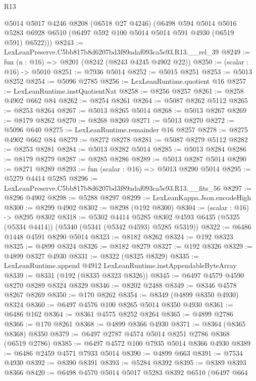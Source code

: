 \begin{lexlean}{R13}
\begin{coremodule}
      @5014
      @5017
      @4246
      @8208
      (@6518 @27 @4246)
      (@6498
        @594
        @5014
        @5016
        @5283
        @6928
        @6510
        (@6497 @592 @100 @5014 @5014 @591 @4930 (@6519 @591) @6522)))
@8243 := LexLeanPreserve.C5bb817b8d6207bd3f89adaf093ca5e93.R13.__rel_39
@8249 := fun (n : @16) => @8201 (@8242 (@8243 @4245 @4902 @22))
@8250 := (scalar : @16) -> @5010
@8251 := @7936 @5014
@8252 := @5015 @8251
@8253 := @5013 @8252
@8254 := @5096 @2785
@8256 := LexLeanRuntime.quotient @16
@8257 := LexLeanRuntime.instQuotientNat
@8258 := @8256 @8257
@8261 := @8258 @4902 @662 @84
@8262 := @8254 @8261
@8264 := @5087 @8262 @5112
@8265 := @8253 @8264
@8267 := @5013 @8265 @5014
@8268 := @5013 @8267
@8269 := @8179 @8262
@8270 := @8268 @8269
@8271 := @5013 @8270
@8272 := @5096 @640
@8275 := LexLeanRuntime.remainder @16 @8257
@8278 := @8275 @4902 @662 @84
@8279 := @8272 @8278
@8281 := @5087 @8279 @5112
@8282 := @8253 @8281
@8284 := @5013 @8282 @5014
@8285 := @5013 @8284
@8286 := @8179 @8279
@8287 := @8285 @8286
@8289 := @5013 @8287 @5014
@8290 := @8271 @8289
@8293 := fun (scalar : @16) => @5013 @8290 @5014
@8295 := @5279 @4414 @5285
@8296 := LexLeanPreserve.C5bb817b8d6207bd3f89adaf093ca5e93.R13.__fits_56
@8297 := @8296 @4902
@8298 := @5288 @8297
@8299 := LexLeanKappa.Json.encodeHigh
@8300 := @8299 @4902
@8302 := @8298 (@192 @8300)
@8304 := (scalar : @16) -> @8295 @8302
@8318 := @5302
    @4414
    @5285
    @8302
    @4593
    @6435
    (@5325 (@5334 @4414))
    (@5340 (@5341 (@5342 @4593) @5285 @5319))
@8322 := @6486 @1448 @4591 @8290 @5014
@8323 := @8182 @8262
@8324 := @192 @8323
@8325 := @4899 @8324
@8326 := @8182 @8279
@8327 := @192 @8326
@8329 := @4899 @8327 @4930
@8331 := @8322 (@8325 @8329)
@8335 := LexLeanRuntime.append @4912 LexLeanRuntime.instAppendableByteArray
@8339 := @8331 (@192 (@8335 @8323 @8326))
@8345 := @6497 @4579 @4590 @8270 @8289 @8324 @8329
@8346 := @8202 @2488
@8349 := @8346 @4578 @8267 @8269
@8350 := @170 @8262
@8354 := @8349 (@4899 @8350 @4930) @8324
@8360 := @6497 @4576 @100 @8265 @5014 @8350 @4930
@8361 := @6486 @162
@8364 := @8361 @4575 @8252 @8264
@8365 := @4899 @2786
@8366 := @170 @8261
@8368 := @4899 @8366 @4930
@8371 := @8364 (@8365 @8368) @8350
@8379 := @6497 @2787 @4574 @5014 @8251 @2786 @8368 (@6519 @2786)
@8385 := @6497 @4572 @100 @7935 @5014 @8366 @4930
@8389 := @6486 @2459 @4571 @7933 @5014
@8390 := @4899 @663
@8391 := @7534 @4930
@8392 := @8390 @8391
@8393 := @5284 @8392
@8395 := @8389 @8393 @8366
@8420 := @6498
    @4570
    @5014
    @5017
    @5283
    @8392
    @6510
    (@6497
      @664

\end{coremodule}
\end{lexlean}
